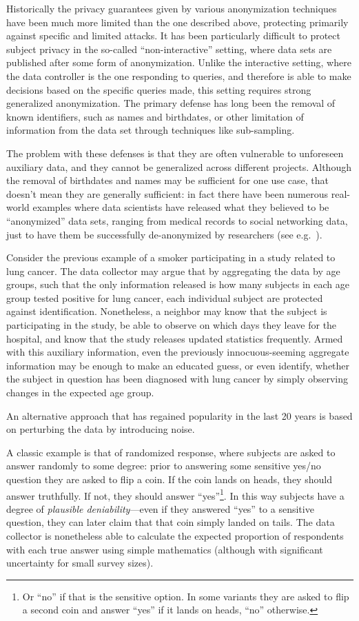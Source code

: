 \documentclass[a4paper,12pt]{article}
\begin{document}
Historically the privacy guarantees given by various anonymization techniques have been much more limited than the one described above, protecting primarily against specific and limited attacks. It has been particularly difficult to protect subject privacy in the so-called ``non-interactive'' setting, where data sets are published after some form of anonymization. Unlike the interactive setting, where the data controller is the one responding to queries, and therefore is able to make decisions based on the specific queries made, this setting requires strong generalized anonymization. The primary defense has long been the removal of known identifiers, such as names and birthdates, or other limitation of information from the data set through techniques like sub-sampling.

The problem with these defenses is that they are often vulnerable to unforeseen auxiliary data, and they cannot be generalized across different projects. Although the removal of birthdates and names may be sufficient for one use case, that doesn't mean they are generally sufficient: in fact there have been numerous real-world examples where data scientists have released what they believed to be ``anonymized'' data sets, ranging from medical records to social networking data, just to have them be successfully de-anonymized by researchers (see e.g.\ \cite{reidentification2011}).

Consider the previous example of a smoker participating in a study related to lung cancer. The data collector may argue that by aggregating the data by age groups, such that the only information released is how many subjects in each age group tested positive for lung cancer, each individual subject are protected against identification. Nonetheless, a neighbor may know that the subject is participating in the study, be able to observe on which days they leave for the hospital, and know that the study releases updated statistics frequently. Armed with this auxiliary information, even the previously innocuous-seeming aggregate information may be enough to make an educated guess, or even identify, whether the subject in question has been diagnosed with lung cancer by simply observing changes in the expected age group.

An alternative approach that has regained popularity in the last 20 years is based on perturbing the data by introducing noise.

A classic example is that of randomized response, where subjects are asked to answer randomly to some degree: prior to answering some sensitive yes/no question they are asked to flip a coin. If the coin lands on heads, they should answer truthfully. If not, they should answer ``yes''\footnote{Or ``no'' if that is the sensitive option. In some variants they are asked to flip a second coin and answer ``yes'' if it lands on heads, ``no'' otherwise.}. In this way subjects have a degree of \emph{plausible deniability}---even if they answered ``yes'' to a sensitive question, they can later claim that that coin simply landed on tails. The data collector is nonetheless able to calculate the expected proportion of respondents with each true answer using simple mathematics (although with significant uncertainty for small survey sizes).
\end{document}
